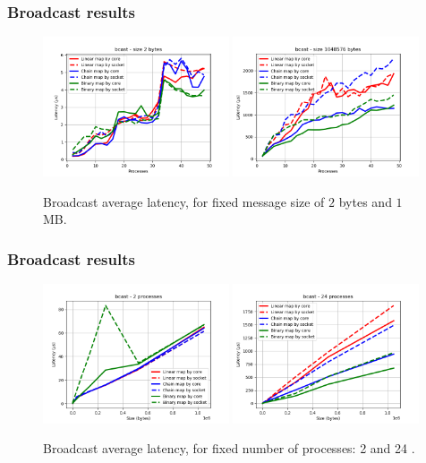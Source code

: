 \documentclass{beamer}
\begin{document}
\begin{frame}
\frametitle{Broadcast results}

\begin{figure}
    \centering
    \includegraphics[width=0.49\textwidth]{../../plots/bcast_fixedSize2.png}
    \includegraphics[width=0.49\textwidth]{../../plots/bcast_fixedSize1048576.png}
    \caption{Broadcast average latency, for fixed message size of $2$ bytes and $1$ MB.}
\end{figure}

\end{frame}

\begin{frame}
    \frametitle{Broadcast results}
    
    \begin{figure}
        \centering
        \includegraphics[width=0.49\textwidth]{../../plots/bcast_fixedprocesses2.png}
        \includegraphics[width=0.49\textwidth]{../../plots/bcast_fixedprocesses24.png}
        \caption{Broadcast average latency, for fixed number of processes: 2 and 24 .}
    \end{figure}
    
\end{frame}
\end{document}
